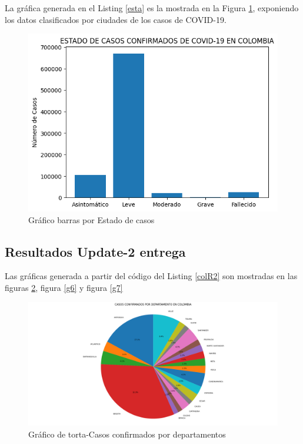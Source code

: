 \documentclass[conference,compsoc,onecolumn]{IEEEtran}
\begin{document}
La gráfica generada en el Listing \ref{esta} es la mostrada en la Figura \ref{g4}, exponiendo los datos clasificados por ciudades de los casos de COVID-19.



\begin{figure}[H]
    \centering
    \includegraphics[scale=0.4]{Pictures/GraficoBarras_Estado_Covid_Colombia_30-09-20.png}
    \caption{Gráfico barras por Estado de casos}
    \label{g4}
\end{figure}

\subsection{Resultados Update-2 entrega}\label{sec:re2}

Las gráficas generada a partir del código del Listing \ref{colR2} son mostradas en las figuras \ref{g5}, figura \ref{g6} y figura \ref{g7}

\begin{figure}[H]
    \centering
    \includegraphics[scale=0.3]{PicturesUpdate/GraficoCircular_Departamento_Covid_Colombia_02-11-20.png}
    \caption{Gráfico de torta-Casos confirmados por departamentos}
    \label{g5}
\end{figure}
\end{document}

